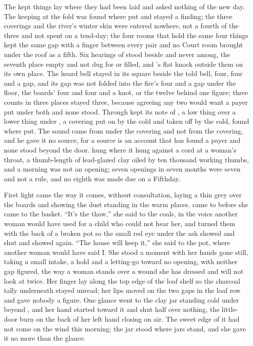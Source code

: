The kept things lay where they had been laid and asked nothing of the new day. The keeping at the fold was found where put and stayed a finding; the three coverings and the river's winter skin were entered nowhere, not a fourth of the three and not spent on a tend-day; the four rooms that hold the same four things kept the same gap with a finger between every pair and no Court room brought under the roof as a fifth. Six hearings of  stood beside and never among, the seventh place empty and not dug for or filled, and 's flat knock outside them on its own place. The heard bell stayed in its square beside the told bell, four, four and a gap, and its gap was not folded into the fire's four and a gap under the floor, the boards' four and four and a knot, or the twelve behind one figure; three counts in three places stayed three, because agreeing any two would want a payer put under both and none stood. Through   kept its note of , a low thing over a lower thing under , a covering put on by the cold and taken off by the cold, found where put. The sound came from under the covering and not from the covering, and he gave it no source, for a source is an account that has found a payer and none stood beyond the door.  hung where it hung against a cord at a woman's throat, a thumb-length of lead-glazed clay oiled by ten thousand working thumbs, and a morning was not an opening; seven openings in seven months were seven and not a rule, and no eighth was made due on a Fifthday.

\scenebreak

First light came the way it comes, without consultation, laying a thin grey over the boards and showing the dust standing in the warm places.  came to  before she came to the basket. “It's the thaw,” she said to the coals, in the voice another woman would have used for a child who could not hear her, and turned them with the back of a broken pot so the small red eye under the ash showed and shut and showed again. “The house will keep it,” she said to the pot, where another woman would have said I. She stood a moment with her hands gone still, taking a small intake, a hold and a letting-go toward no opening, with neither gap figured, the way a woman stands over a wound she has dressed and will not look at twice. Her finger lay along the top edge of the loaf shelf so the charcoal tally underneath stayed unread; her lips moved on the two gaps in the loaf row and gave nobody a figure. One glance went to the clay jar standing cold under  beyond , and her hand started toward it and shut half over nothing, the little-door burn on the back of her left hand closing on air. The sweet edge of it had not come on the wind this morning; the jar stood where jars stand, and she gave it no more than the glance.

